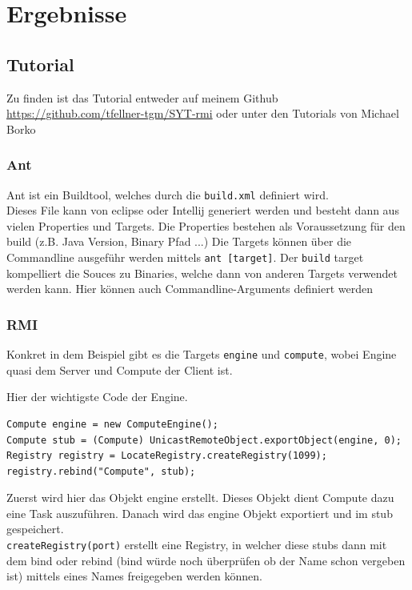 
\section{Ergebnisse}
\label{sec:Ergebnisse}

\subsection{Tutorial}

Zu finden ist das Tutorial entweder auf meinem Github \url{https://github.com/tfellner-tgm/SYT-rmi} \cite{repo} oder unter den Tutorials von Michael Borko \cite{bsp-command-pattern}

\subsubsection{Ant}

Ant ist ein Buildtool, welches durch die \texttt{build.xml} definiert wird.\\
Dieses File kann von eclipse oder Intellij generiert werden und besteht dann aus vielen Properties und Targets.
Die Properties bestehen als Voraussetzung f\"ur den build (z.B. Java Version, Binary Pfad ...)
Die Targets k\"onnen \"uber die Commandline ausgef\"uhr werden mittels \texttt{ant [target]}. Der \texttt{build} target kompelliert die Souces zu Binaries, welche dann von anderen Targets verwendet werden kann. Hier k\"onnen auch Commandline-Arguments definiert werden

\subsubsection{RMI}

Konkret in dem Beispiel gibt es die Targets \texttt{engine} und \texttt{compute}, wobei Engine quasi dem Server und Compute der Client ist.

Hier der wichtigste Code der Engine.

\begin{lstlisting}[style=Java, caption=Engine]
Compute engine = new ComputeEngine();
Compute stub = (Compute) UnicastRemoteObject.exportObject(engine, 0);
Registry registry = LocateRegistry.createRegistry(1099);
registry.rebind("Compute", stub);
\end{lstlisting}

Zuerst wird hier das Objekt engine erstellt. Dieses Objekt dient Compute dazu
eine Task auszuf\"uhren.
Danach wird das engine Objekt exportiert und im stub gespeichert. \\
\texttt{createRegistry(port)} erstellt eine Registry, in welcher diese stubs dann mit
dem bind oder rebind (bind w\"urde noch \"uberpr\"ufen ob der Name schon vergeben ist) mittels eines Names freigegeben werden k\"onnen.

